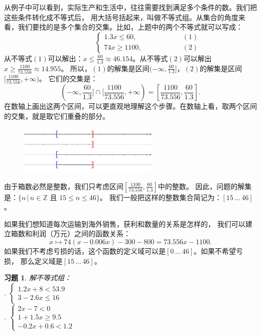 \documentclass[12pt,UTF8]{ctexbook}
\newtheorem{xt}{习题}[section]
\begin{document}
从例子中可以看到，实际生产和生活中，往往需要找到满足多个条件的数。我们把这些条件转化成不等式后，
用大括号括起来，叫做不等式组。从集合的角度来看，我们要找的是多个集合的交集。比如，上题中的两个不等式就可以写成：
$$ \quad \quad \quad \quad \quad\left\{
\begin{array}{cr}
    1.3x \leqslant 60, & \quad \quad \quad \quad \quad (1) \\
    74x \geqslant 1100, & \quad \quad \quad \quad \quad (2)
\end{array}\right.
$$
从不等式$(1)$可以解出：$x \leqslant \frac{60}{1.3} \approx 46.154$。从不等式$(2)$可以解出$x \geqslant \frac{1100}{73.556} \approx 14.955$。
所以，$(1)$的解集是区间$(-\infty, \frac{60}{1.3}]$，$(2)$的解集是区间$[\frac{1100}{73.556}, +\infty)$。
它们的交集是：
$$(-\infty, \frac{60}{1.3}] \cap [\frac{1100}{73.556}, +\infty)  = [\frac{1100}{73.556}, \frac{60}{1.3}]. $$
在数轴上画出这两个区间，可以更直观地理解这个步骤。在数轴上看，取两个区间的交集，就是取它们重叠的部分。

\begin{figure}[H] %
    \vspace{8pt}
    \centering
    \includegraphics[width=0.6\textwidth]{一元一次不等式组1.png}
\end{figure}

由于箱数必然是整数，我们只考虑区间$[\frac{1100}{73.556}, \frac{60}{1.3}]$中的整数。
因此，问题的解集是：$\{n \, | \, n \in \mathbb{Z} \mbox{ 且 }15 \leqslant n \leqslant 46\}$。
我们一般把这样的整数集合简记为：$[15 \, \ldots \, 46]$。

如果我们想知道每次运输到海外销售，获利和数量的关系是怎样的，
我们可以建立箱数和利润（万元）之间的函数关系：
$$ x \mapsto 74 (x - 0.006x) - 300 - 800 = 73.556 x - 1100. $$
如果我们不考虑亏损的话，这个函数的定义域可以是$[0 \, \ldots \, 46]$。如果不希望亏损，
那么定义域是$[15 \, \ldots \, 46]$。

\begin{xt}\label{xt:5-5-0}
    解不等式组：\\
    . $\left\{
        \begin{array}{cr}
            1.2x + 8 < 53.9 \\
            3 - 2.6x \leqslant 16 
        \end{array}\right.$ \\
    . $\left\{
        \begin{array}{cr}
            2x - 7 < 0 \\
            1 + 1.5x \geqslant 9.5 \\
            -0.2x + 0.6 < 1.2 
        \end{array}\right.$ 
\end{xt}
\end{document}
